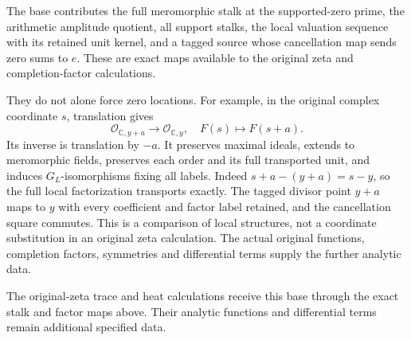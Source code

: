 The base contributes the full meromorphic stalk at the supported-zero
prime, the arithmetic amplitude quotient, all support stalks, the local
valuation sequence with its retained unit kernel, and a tagged source
whose cancellation map sends zero sums to \(e\). These are exact maps
available to the original zeta and completion-factor calculations.

They do not alone force zero locations. For example, in the original
complex coordinate \(s\), translation gives \[
\mathcal O_{\mathbb C,y+a}\to\mathcal O_{\mathbb C,y},\quad F(s)\mapsto F(s+a).
\tag{LP11.1}
\] Its inverse is translation by \(-a\). It preserves maximal ideals,
extends to meromorphic fields, preserves each order and its full
transported unit, and induces \(G_L\)-isomorphisms fixing all labels.
Indeed \(s+a-(y+a)=s-y\), so the full local factorization transports
exactly. The tagged divisor point \(y+a\) maps to \(y\) with every
coefficient and factor label retained, and the cancellation square
commutes. This is a comparison of local structures, not a coordinate
substitution in an original zeta calculation. The actual original
functions, completion factors, symmetries and differential terms supply
the further analytic data.

The original-zeta trace and heat calculations receive this base through
the exact stalk and factor maps above. Their analytic functions and
differential terms remain additional specified data.
